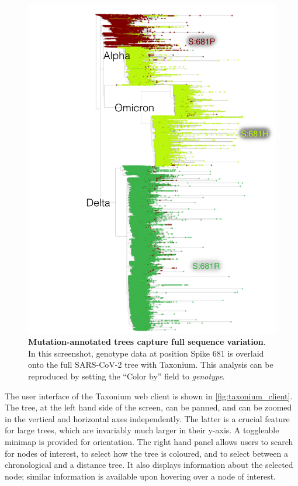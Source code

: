 \documentclass[twocolumn]{bioRxiv}
\begin{document}
\begin{figure}
\begin{center}
\includegraphics[width=0.9\linewidth]{Figures/681.pdf}
\end{center}
\caption{\textbf{Mutation-annotated trees capture full sequence variation}. In this screenshot, genotype data at position Spike 681  is overlaid onto the full SARS-CoV-2 tree with Taxonium. This analysis can be reproduced by setting the ``Color by'' field to \textit{genotype}.}
\label{fig:681}
\end{figure}

The user interface of the Taxonium web client is shown in \cref{fig:taxonium_client}. The tree, at the left hand side of the screen, can be panned, and can be zoomed in the vertical and horizontal axes independently. The latter is a crucial feature for large trees, which are invariably much larger in their y-axis. A toggleable minimap is provided for orientation. The right hand panel allows users to search for nodes of interest, to select how the tree is coloured, and to select between a chronological and a distance tree. It also displays information about the selected node; similar information is available upon hovering over a node of interest.
\end{document}
